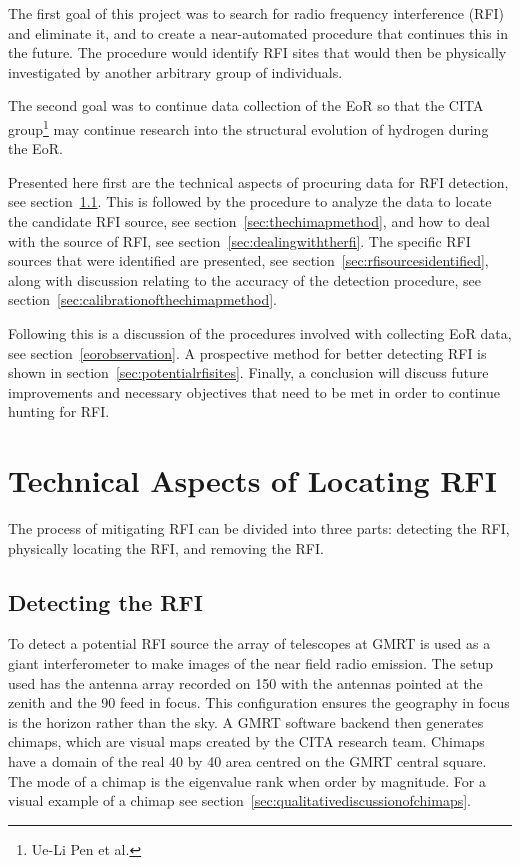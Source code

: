 \documentclass[a4paper,12pt]{article}
\begin{document}
The first goal of this project was to search for radio frequency interference (RFI) and eliminate it, and to create a near-automated procedure that continues this in the future. The procedure would identify RFI sites that would then be physically investigated by another arbitrary group of individuals.

The second goal was to continue data collection of the EoR so that the CITA group\footnote{Ue-Li Pen et al.} may continue research into the structural evolution of hydrogen during the EoR.

Presented here first are the technical aspects of procuring data for RFI detection, see section~\ref{sec:detectingtherfi}. This is followed by the procedure to analyze the data to locate the candidate RFI source, see section~\ref{sec:thechimapmethod}, and how to deal with the source of RFI, see section~\ref{sec:dealingwiththerfi}. The specific RFI sources that were identified are presented, see section~\ref{sec:rfisourcesidentified}, along with discussion relating to the accuracy of the detection procedure, see section~\ref{sec:calibrationofthechimapmethod}.

Following this is a discussion of the procedures involved with collecting EoR data, see section~\ref{eorobservation}. A prospective method for better detecting RFI is shown in section~\ref{sec:potentialrfisites}. Finally, a conclusion will discuss future improvements and necessary objectives that need to be met in order to continue hunting for RFI.

\section{Technical Aspects of Locating RFI}
\label{sec:technicalaspectsoflocatingrfi}

The process of mitigating RFI can be divided into three parts: detecting the RFI, physically locating the RFI, and removing the RFI.  

\subsection{Detecting the RFI}
\label{sec:detectingtherfi}


To detect a potential RFI source the array of telescopes at GMRT is used as a giant interferometer to make images of the near field radio emission. The setup used has the antenna array recorded on \unit{150}{\mega\hertz} with the antennas pointed at the zenith and the \unit{90}{\centi\metre} feed in focus. This configuration ensures the geography in focus is the horizon rather than the sky. A GMRT software backend then generates chimaps, which are visual maps created by the CITA research team. Chimaps have a domain of the real \unit{40}{\kilo\metre} by \unit{40}{\kilo\metre} area centred on the GMRT central square. The mode of a chimap is the eigenvalue rank when order by magnitude. For a visual example of a chimap see section~\ref{sec:qualitativediscussionofchimaps}.
\end{document}
